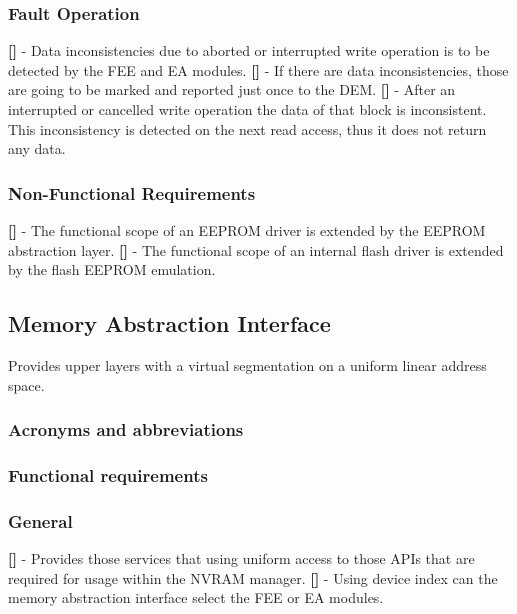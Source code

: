 \subsubsection{Fault Operation}
{\bf []} - Data inconsistencies due to aborted or interrupted write operation is to be detected by the FEE and EA modules.\newline
{\bf []} - If there are data inconsistencies, those are going to be marked and reported just once to the \mbox{DEM}. \newline
\newline
{\bf []} - After an interrupted or cancelled write operation the data of that block is inconsistent. This inconsistency is detected on the next read access, thus it does not return any data.

\subsubsection{Non-Functional Requirements}
{\bf []} - The functional scope of an EEPROM driver is extended by the EEPROM abstraction layer.\newline
\newline
{\bf []} - The functional scope of an internal flash driver is extended by the flash EEPROM emulation.

\newpage
\subsection{Memory Abstraction Interface}
Provides upper layers with a virtual segmentation on a uniform linear address space.
\subsubsection{Acronyms and abbreviations}
\subsubsection{Functional requirements}
\subsubsection{General}
{\bf []} - Provides those services that using uniform access to those APIs that are required for usage within the \mbox{NVRAM} manager.\newline
\newline
{\bf []} - Using device index can the memory abstraction interface select the FEE or EA modules.

